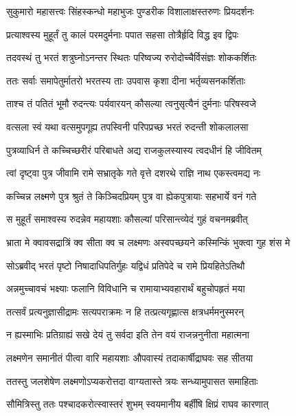 \twolineshloka
{सुकुमारो महासत्त्वः सिंहस्कन्धो महाभुजः}
{पुण्डरीक विशालाक्षस्तरुणः प्रियदर्शनः} %

\twolineshloka
{प्रत्याश्वस्य मुहूर्तं तु कालं परमदुर्मनाः}
{पपात सहसा तोत्रैर्हृदि विद्ध इव द्विपः} %

\twolineshloka
{तदवस्थं तु भरतं शत्रुघ्नोऽनन्तर स्थितः}
{परिष्वज्य रुरोदोच्चैर्विसंज्ञः शोककर्शितः} %

\twolineshloka
{ततः सर्वाः समापेतुर्मातरो भरतस्य ताः}
{उपवास कृशा दीना भर्तृव्यसनकर्शिताः} %

\twolineshloka
{ताश्च तं पतितं भूमौ रुदन्त्यः पर्यवारयन्}
{कौसल्या त्वनुसृत्यैनं दुर्मनाः परिषस्वजे} %

\twolineshloka
{वत्सला स्वं यथा वत्समुपगूह्य तपस्विनी}
{परिपप्रच्छ भरतं रुदन्ती शोकलालसा} %

\twolineshloka
{पुत्रव्याधिर्न ते कच्चिच्छरीरं परिबाधते}
{अद्य राजकुलस्यास्य त्वदधीनं हि जीवितम्} %

\twolineshloka
{त्वां दृष्ट्वा पुत्र जीवामि रामे सभ्रातृके गते}
{वृत्ते दशरथे राज्ञि नाथ एकस्त्वमद्य नः} %

\twolineshloka
{कच्चिन्न लक्ष्मणे पुत्र श्रुतं ते किञ्चिदप्रियम्}
{पुत्र वा ह्येकपुत्रायाः सहभार्ये वनं गते} %

\twolineshloka
{स मुहूर्तं समाश्वस्य रुदन्नेव महायशाः}
{कौसल्यां परिसान्त्व्येदं गुहं वचनमब्रवीत्} %

\twolineshloka
{भ्राता मे क्वावसद्रात्रिं क्व सीता क्व च लक्ष्मणः}
{अस्वपच्छयने कस्मिन्किं भुक्त्वा गुह शंस मे} %

\twolineshloka
{सोऽब्रवीद् भरतं पृष्टो निषादाधिपतिर्गुहः}
{यद्विधं प्रतिपेदे च रामे प्रियहितेऽतिथौ} %

\twolineshloka
{अन्नमुच्चावचं भक्ष्याः फलानि विविधानि च}
{रामायाभ्यवहारार्थं बहुचोपहृतं मया} %

\twolineshloka
{तत्सर्वं प्रत्यनुज्ञासीद्रामः सत्यपराक्रमः}
{न हि तत्प्रत्यगृह्णात्स क्षत्रधर्ममनुस्मरन्} %

\twolineshloka
{न ह्यस्माभिः प्रतिग्राह्यं सखे देयं तु सर्वदा}
{इति तेन वयं राजन्ननुनीता महात्मना} %

\twolineshloka
{लक्ष्मणेन समानीतं पीत्वा वारि महायशाः}
{औपवास्यं तदाकार्षीद्राघवः सह सीतया} %

\twolineshloka
{ततस्तु जलशेषेण लक्ष्मणोऽप्यकरोत्तदा}
{वाग्यतास्ते त्रयः सन्ध्यामुपासत समाहिताः} %

\twolineshloka
{सौमित्रिस्तु ततः पश्चादकरोत्स्वास्तरं शुभम्}
{स्वयमानीय बर्हींषि क्षिप्रं राघव कारणात्} %

